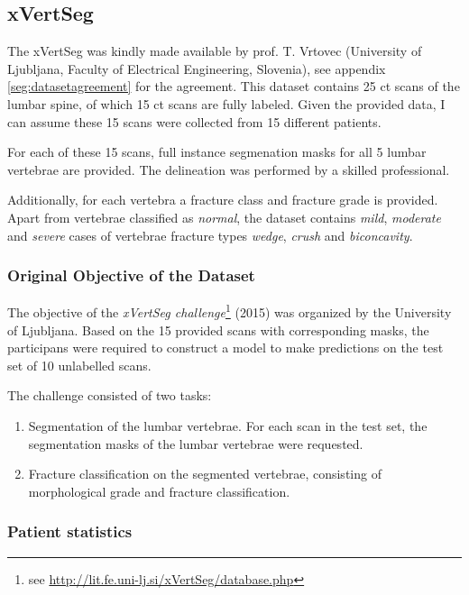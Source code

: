 \subsection{xVertSeg}

The xVertSeg \cite{Ibragimov2012, xxx} was kindly made available by prof. T. Vrtovec (University of Ljubljana, Faculty of Electrical Engineering, Slovenia), see appendix \ref{seg:datasetagreement} for the agreement.
This dataset contains 25 \acrfull{ct} scans of the lumbar spine, of which 15 \acrshort{ct} scans are fully labeled.
Given the provided data, I can assume these 15 scans were collected from 15 different patients.

For each of these 15 scans, full instance segmenation masks for all 5 lumbar vertebrae are provided. The delineation was performed by a skilled professional.

Additionally, for each vertebra a fracture class and fracture grade is provided. 
Apart from vertebrae classified as \textit{normal}, the dataset contains \textit{mild}, \textit{moderate} and \textit{severe} cases of vertebrae fracture types \textit{wedge}, \textit{crush} and \textit{biconcavity}.

\subsubsection{Original Objective of the Dataset}

The objective of the \textit{xVertSeg challenge}\footnote{see \url{http://lit.fe.uni-lj.si/xVertSeg/database.php}} (2015) was organized by the University of Ljubljana.
Based on the 15 provided scans with corresponding masks, the participans were required to construct a model to make predictions on the test set of 10 unlabelled scans.

The challenge consisted of two tasks:
\begin{enumerate}
    \item Segmentation of the lumbar vertebrae. For each scan in the test set, the segmentation masks of the lumbar vertebrae were requested.
    \item Fracture classification on the segmented vertebrae, consisting of morphological grade and fracture classification.
\end{enumerate}

\subsubsection{Patient statistics}

